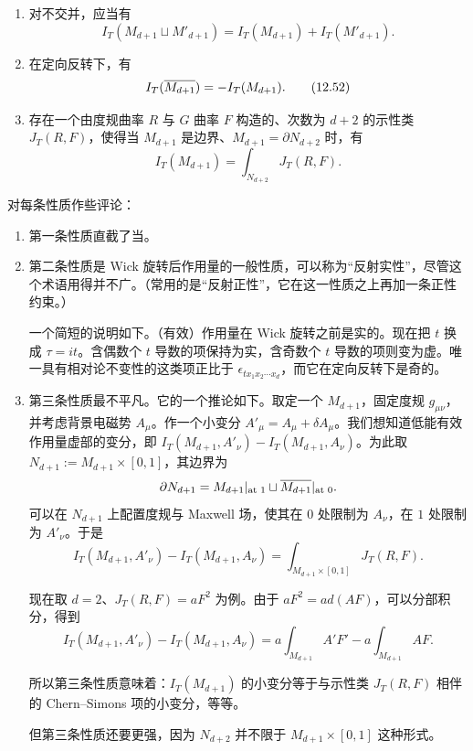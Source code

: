 \begin{enumerate}
  \item 对不交并，应当有
  \begin{equation}
    I_T(M_{d+1}\sqcup M'_{d+1})
    =I_T(M_{d+1})+I_T(M'_{d+1}).
    \tag{12.51}
  \end{equation}
  \item 在定向反转下，有
  \begin{equation}
    I_T(\overline{M_{d+1}})=-I_T(M_{d+1}).
    \tag{12.52}
  \end{equation}
  \item 存在一个由度规曲率 $R$ 与 $G$ 曲率 $F$ 构造的、次数为 $d+2$ 的示性类 $J_T(R,F)$，使得当 $M_{d+1}$ 是边界、$M_{d+1}=\partial N_{d+2}$ 时，有
  \begin{equation}
    I_T(M_{d+1})=\int_{N_{d+2}}J_T(R,F).
    \tag{12.53}
  \end{equation}
\end{enumerate}

对每条性质作些评论：

\begin{enumerate}
  \item 第一条性质直截了当。
  \item 第二条性质是 Wick 旋转后作用量的一般性质，可以称为“反射实性”，尽管这个术语用得并不广。（常用的是“反射正性”，它在这一性质之上再加一条正性约束。）

  一个简短的说明如下。（有效）作用量在 Wick 旋转之前是实的。现在把 $t$ 换成 $\tau=it$。含偶数个 $t$ 导数的项保持为实，含奇数个 $t$ 导数的项则变为虚。唯一具有相对论不变性的这类项正比于 $\epsilon_{tx_1x_2\cdots x_d}$，而它在定向反转下是奇的。
  \item 第三条性质最不平凡。它的一个推论如下。取定一个 $M_{d+1}$，固定度规 $g_{\mu\nu}$，并考虑背景电磁势 $A_\mu$。作一个小变分 $A'_\mu=A_\mu+\delta A_\mu$。我们想知道低能有效作用量虚部的变分，即 $I_T(M_{d+1},A'_\nu)-I_T(M_{d+1},A_\nu)$。为此取 $N_{d+1}:=M_{d+1}\times[0,1]$，其边界为
  \[
    \partial N_{d+1}=M_{d+1}|_{\text{at }1}
    \sqcup\overline{M_{d+1}}|_{\text{at }0}.
  \]
  可以在 $N_{d+1}$ 上配置度规与 Maxwell 场，使其在 $0$ 处限制为 $A_\nu$，在 $1$ 处限制为 $A'_\nu$。于是
  \begin{equation}
    I_T(M_{d+1},A'_\nu)-I_T(M_{d+1},A_\nu)
    =\int_{M_{d+1}\times[0,1]}J_T(R,F).
    \tag{12.54}
  \end{equation}

  现在取 $d=2$、$J_T(R,F)=aF^2$ 为例。由于 $aF^2=ad(AF)$，可以分部积分，得到
  \begin{equation}
    I_T(M_{d+1},A'_\nu)-I_T(M_{d+1},A_\nu)
    =a\int_{M_{d+1}}A'F'-a\int_{M_{d+1}}AF .
    \tag{12.55}
  \end{equation}

  所以第三条性质意味着：$I_T(M_{d+1})$ 的小变分等于与示性类 $J_T(R,F)$ 相伴的 Chern--Simons 项的小变分，等等。

  但第三条性质还要更强，因为 $N_{d+2}$ 并不限于 $M_{d+1}\times[0,1]$ 这种形式。
\end{enumerate}

